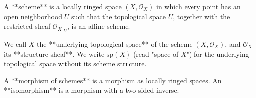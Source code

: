 A **scheme** is a locally ringed space $(X, \mathcal{O}_X)$ in which every point has an open neighborhood $U$ such that the topological space $U$, together with the restricted sheaf $\mathcal{O}_X|_U$, is an affine scheme.

We call $X$ the **underlying topological space** of the scheme $(X, \mathcal{O}_X)$, and $\mathcal{O}_X$ its **structure sheaf**. We write $\text{sp}(X)$ (read "space of $X$") for the underlying topological space without its scheme structure.

A **morphism of schemes** is a morphism as locally ringed spaces. An **isomorphism** is a morphism with a two-sided inverse.
